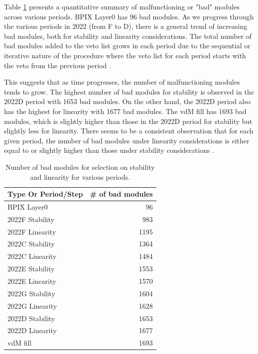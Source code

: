 Table \ref{tab:bad_modules} presents a quantitative summary of malfunctioning or "bad" modules across various periods. BPIX Layer0 has 96 bad modules. As we progress through the various periods in 2022 (from F to D), there is a general trend of increasing bad modules, both for stability and linearity considerations. The total number of bad modules  added to the veto list grows in each period due to the sequential or iterative nature of the procedure where the veto list for each period starts with the veto from the previous period \cite{pas_22}.


This suggests that as time progresses, the number of malfunctioning modules tends to grow. The highest number of bad modules for stability is observed in the 2022D period with 1653 bad modules. On the other hand, the 2022D period also has the highest for linearity with 1677 bad modules. The vdM fill has 1693 bad modules, which is slightly higher than those in the 2022D period for stability but slightly less for linearity. There seems to be a consistent observation that for each given period, the number of bad modules under linearity considerations is either equal to or slightly higher than those under stability considerations \cite{pas_22}. %

\begin{table}[h]
  \centering
  \caption[Bad modules per period]{Number of bad modules for selection on stability and linearity for various periods.}
\begin{tabular}{lr}
\textbf{Type Or Period/Step} & \textbf{\# of bad modules} \\
\hline
BPIX Layer0 & 96 \\
2022F Stability & 983 \\
2022F Linearity & 1195 \\
2022C Stability & 1364 \\
2022C Linearity & 1484 \\
2022E Stability & 1553 \\
2022E Linearity & 1570 \\
2022G Stability & 1604 \\
2022G Linearity & 1628 \\
2022D Stability & 1653 \\
2022D Linearity & 1677 \\
vdM fill & 1693 \\
\end{tabular}
\label{tab:bad_modules}
\end{table}


